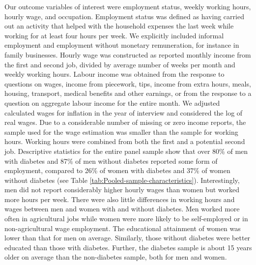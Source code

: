 \documentclass[12pt,english]{article}
\begin{document}
Our outcome variables of interest were employment status, weekly working hours, hourly wage, and occupation. Employment status was defined as having carried out an activity that helped with the household expenses the last week while working for at least four hours per week. We explicitly included informal employment and employment without monetary remuneration, for instance in family businesses.  Hourly wage was constructed as reported monthly income from the first and second job, divided by average number of weeks per month and weekly working hours.  Labour income was obtained from the response to questions on wages, income from piecework, tips, income from extra hours, meals, housing, transport, medical benefits and other earnings, or from the response to a question on aggregate labour income for the entire month. We adjusted calculated wages for inflation in the year of interview and considered the log of real wages. Due to a considerable number of missing or zero income reports, the sample used for the wage estimation was smaller than the sample for working hours. Working hours were combined from both the first and a potential second job. Descriptive statistics for the entire panel sample show that over 80\% of men with diabetes and 87\% of men without diabetes reported some form of employment, compared to 26\% of women with diabetes and 37\% of women without diabetes (see Table \ref{tab:Pooled-sample-characteristics}). Interestingly, men did not report considerably higher hourly wages than women but worked more hours per week. There were also little differences in working hours and wages between men and women with and without diabetes. Men worked more often in agricultural jobs while women were more likely to be self-employed or in non-agricultural wage employment. The educational attainment of women was lower than that for men on average. Similarly, those without diabetes were better educated than those with diabetes. Further, the diabetes sample is about 15 years older on average than the non-diabetes sample, both for men and women.
\end{document}
